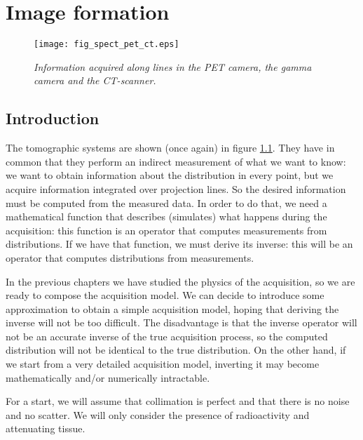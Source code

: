 \chapter{Image formation \label{ch:image_formation}}

%
%
%
\begin{figure}[tb]
\centering
\texttt{[image: fig\_spect\_pet\_ct.eps]}
\caption{\label{fig:spect_pet_ct_bis} \emph{Information acquired along lines
in the PET camera, the gamma camera and the CT-scanner.}}
\end{figure}

\section{Introduction}
The tomographic systems are shown (once again) in figure
\ref{fig:spect_pet_ct_bis}. They have in common that they perform an indirect
measurement of what we want to know: we want to obtain information about the
distribution in every point, but we acquire information integrated over
projection lines. So the desired information must be computed from the
measured data. In order to do that, we need a mathematical function that
describes (simulates) what happens during the acquisition: this function is an
operator that computes measurements from distributions. If we have that
function, we must derive its inverse: this will be an operator that computes
distributions from measurements.

In the previous chapters we have studied the physics of the acquisition, so we
are ready to compose the acquisition model. We can decide to introduce some
approximation to obtain a simple acquisition model, hoping that deriving the
inverse will not be too difficult. The disadvantage is that the inverse
operator will not be an accurate inverse of the true acquisition process, so
the computed distribution will not be identical to the true distribution. On
the other hand, if we start from a very detailed acquisition model, inverting
it may become mathematically and/or numerically intractable.

For a start, we will assume that collimation is perfect and that there is no
noise and no scatter. We will only consider the presence of radioactivity
and attenuating tissue.

